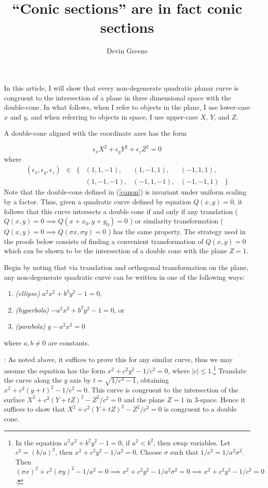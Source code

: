 \documentclass[12pt]{article}
\title{``Conic sections'' are in fact conic sections}
\author{Devin Greene}
\date{}
\newcommand{\eps}{\epsilon}
\begin{document}
\maketitle

In this article, I will show that every non-degenerate quadratic
planar curve is congruent to the intersection of a plane in three
dimensional space with the double-cone.  In what follows, when I 
refer to objects in the plane, I use lower-case $x$ and $y$, and
when referring to objects in space, I use upper-case $X$, $Y$, and
$Z$.

A double-cone aligned with the coordinate axes has the form 

\begin{equation} \label{canon} \eps_x X^2 + \eps_y Y^2 + \eps_z
Z^2 = 0\end{equation}
where
$$\begin{matrix}(\eps_x,\eps_y,\eps_z) & \in  &
\{ &(1,1,-1),&(1,-1,1),&(-1,1,1), &\\
&&&(1,-1,-1),&(-1,1,-1),&(-1,-1,1) &\}\end{matrix}$$
Note that the double-cone defined in (\ref{canon}) is invariant under
uniform scaling by a factor.  Thus, given a quadratic curve
defined by equation $Q(x,y) = 0$, it follows that this curve
intersects a double cone if and only if any translation ( $Q(x,y) = 0 \implies
Q(x+x_0, y+y_0) = 0$ ) or similarity transformation \break ( $Q(x,y) =
0\implies Q(\sigma x, \sigma y) = 0$ ) has the same property.  The
strategy used in the proofs below consists of finding a convenient
transformation of $Q(x,y) = 0$ which can be shown to be the
intersection of a double cone with the plane $Z = 1$.

Begin by noting that via translation and orthogonal transformation on
the plane, any non-degenerate quadratic curve can be written in one of
the following ways:

\begin{enumerate}
\item {\it (ellipse)} $a^2x^2 + b^2y^2 - 1 = 0$,
\item {\it (hyperbola)} $-a^2x^2 + b^2y^2 - 1 = 0$, or
\item {\it (parabola)} $y - a^2x^2 = 0$
\end{enumerate}
where $a,b \neq 0$ are constants.

\medskip

: As noted above, it suffices to prove this for
any similar curve, thus
we may assume the equation has the form $x^2 + c^2 y^2 - 1/c^2 = 0$,
where $|c| \leq 1$.\footnote{
In the equation $a^2x^2 + b^2y^2 - 1 = 0$, if $a^2 < b^2$, then swap
variables.  Let $c^2 = (b/a)^2$, then $x^2 + c^2 y^2 - 1/a^2 = 0$.
Choose $\sigma$ such that $1/c^2 = 1/a^2\sigma^2$.  Then
$(\sigma x)^2
+ c^2 (\sigma y)^2 - 1/a^2 = 0 \implies x^2  + c^2 y^2 - 1/a^2\sigma^2
= 0 \implies x^2 + c^2 y^2 - 1/c^2 = 0$.
}  Translate the curve along the $y$ axis by $t =
\sqrt{1/c^4 - 1}$, obtaining $x^2 + c^2 (y + t)^2 - 1/c^2 = 0$.  This
curve is congruent to the intersection of the surface $X^2 + c^2 (Y +
tZ)^2 - Z^2/c^2 = 0$ and the plane $Z = 1$ in 3-space.  Hence it
suffices to show that $ X^2 + c^2 (Y + tZ)^2 - Z^2/c^2 = 0$ is
congruent to a double cone.
\end{document}
